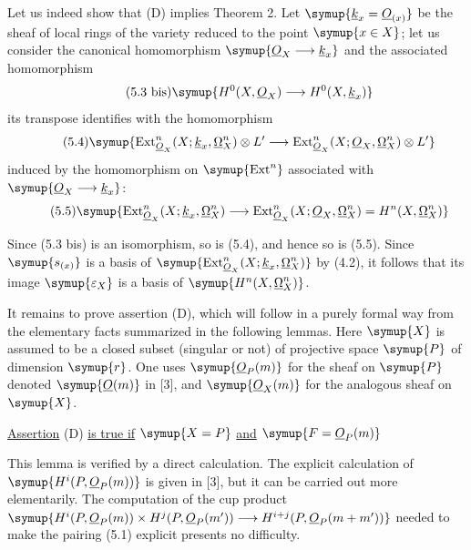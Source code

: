 Let us indeed show that (D) implies Theorem 2. Let $\symup{\underline{k}_x=\Osh_{(x)}}$ be the sheaf
of local rings of the variety reduced to the point $\symup{x\in X}$; let us consider the
canonical homomorphism $\symup{\Osh_X\longrightarrow \underline{k}_x}$ and the associated
homomorphism
\begin{equation}\tag{5.3 bis}
  \symup{H^{0}(X,\Osh_X)\longrightarrow H^{0}(X,\underline{k}_x)}
\end{equation}
its transpose identifies with the homomorphism
\begin{equation}\tag{5.4}
  \symup{\operatorname{Ext}_{\Osh_X}^{n}(X;\underline{k}_x,\underline{\Omega}_X^{n})\otimes L'
  \longrightarrow
  \operatorname{Ext}_{\Osh_X}^{n}(X;\Osh_X,\underline{\Omega}_X^{n})\otimes L'}
\end{equation}
induced by the homomorphism on $\symup{\operatorname{Ext}^{n}}$ associated with
$\symup{\Osh_X\longrightarrow \underline{k}_x}$:
\begin{equation}\tag{5.5}
  \symup{\operatorname{Ext}_{\Osh_X}^{n}(X;\underline{k}_x,\underline{\Omega}_X^{n})
  \longrightarrow
  \operatorname{Ext}_{\Osh_X}^{n}(X;\Osh_X,\underline{\Omega}_X^{n})
  =H^{n}(X,\underline{\Omega}_X^{n})}
\end{equation}

Since (5.3 bis) is an isomorphism, so is (5.4),
and hence so is (5.5). Since $\symup{s_{(x)}}$ is a basis of
$\symup{\operatorname{Ext}_{\Osh_X}^{n}(X;\underline{k}_x,\underline{\Omega}_X^{n})}$ by (4.2), it follows that
its image $\symup{\varepsilon_X}$ is a basis of $\symup{H^{n}(X,\underline{\Omega}_X^{n})}$.

It remains to prove assertion (D), which will follow in a purely formal way
from the elementary facts summarized in the following lemmas. Here $\symup{X}$ is
assumed to be a closed subset (singular or not) of projective space $\symup{P}$ of
dimension $\symup{r}$. One uses $\symup{\Osh_P(m)}$ for the sheaf on $\symup{P}$ denoted $\symup{\Osh(m)}$ in
[3], and $\symup{\Osh_X(m)}$ for the analogous sheaf on $\symup{X}$.

 \uline{Assertion} (D) \uline{is true if} $\symup{X=P}$ \uline{and} $\symup{F=\Osh_P(m)}$

This lemma is verified by a direct calculation. The explicit calculation of
$\symup{H^{i}(P,\Osh_P(m))}$ is given in [3], but it can be carried out more
elementarily. The computation of the cup product
$\symup{H^{i}(P,\Osh_P(m))\times H^{j}(P,\Osh_P(m'))\longrightarrow H^{i+j}(P,\Osh_P(m+m'))}$
needed to make the pairing (5.1) explicit presents no
difficulty.

